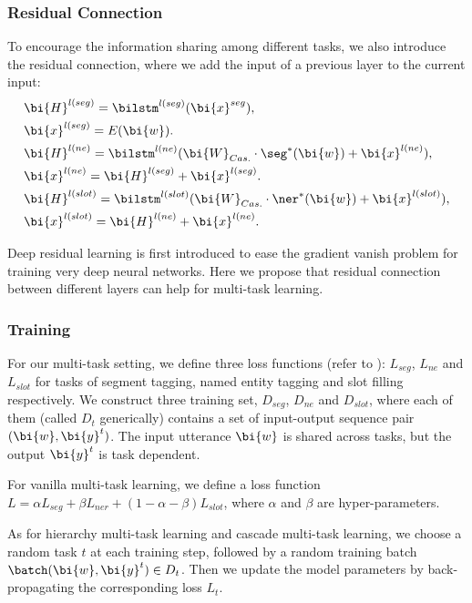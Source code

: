 \subsubsection{Residual Connection}
To encourage the information sharing among different tasks,
we also introduce the residual connection,
where we add the input of a previous layer to the current input:
\begin{eqnarray*}
	& \bi{H}^{l(seg)}=\bilstm^{l(seg)}(\bi{x}^{seg}), \\
	& \bi{x}^{l(seg)}=E(\bi{w}). \\
	& \bi{H}^{l(ne)}=\bilstm^{l(ne)}(\bi{W}_{Cas.}\cdot \seg^*(\bi{w})+\bi{x}^{l(ne)}), \\
	& \bi{x}^{l(ne)}= \bi{H}^{l(seg)}+\bi{x}^{l(seg)}. \\
	& \bi{H}^{l(slot)}=\bilstm^{l(slot)}(\bi{W}_{Cas.}\cdot 
	\ner^*(\bi{w})+\bi{x}^{l(slot)}), \\
	& \bi{x}^{l(slot)}= \bi{H}^{l(ne)}+\bi{x}^{l(ne)}.
\end{eqnarray*}

Deep residual learning \cite{he2016deep} is first introduced to ease the gradient vanish problem for training very deep neural networks.
Here we propose that residual connection between different layers can help for multi-task learning.

\subsubsection{Training}
\label{sec:training}
For our multi-task setting, 
we define three loss functions (refer to ):
$L_{seg}$, $L_{ne}$ and $L_{slot}$ for tasks of segment tagging, named entity tagging and slot filling respectively.
We construct three training set,
$D_{seg}$, $D_{ne}$ and $D_{slot}$,
where each of them (called $D_t$ generically) contains a set of 
input-output sequence pair $(\bi{w}, \bi{y}^t)$.
The input utterance $\bi{w}$ is shared across tasks, but the output $\bi{y}^t$ is task dependent.

For vanilla multi-task learning,
we define a loss function $L=\alpha L_{seg}+\beta L_{ner}+(1-\alpha-\beta)L_{slot}$, 
where $\alpha$ and $\beta$ are hyper-parameters.

As for hierarchy multi-task learning and cascade multi-task learning,
we choose a random task $t$ at each training step,
followed by a random training batch $\batch(\bi{w}, \bi{y}^t) \in D_t$.
Then we update the model parameters by back-propagating
the corresponding loss $L_t$.
